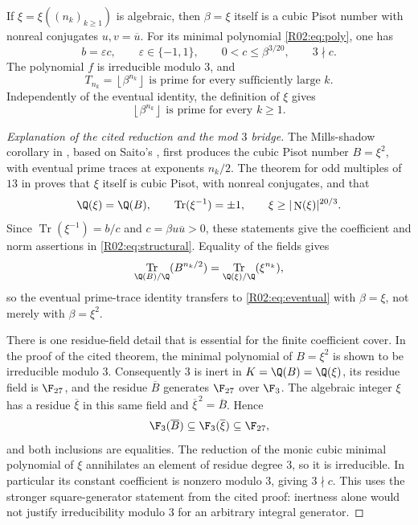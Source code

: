 \documentclass[11pt,a4paper]{article}
\theoremstyle{definition}\newtheorem{definition}[theorem]{Definition}
\theoremstyle{remark}\newtheorem{remark}[theorem]{Remark}
\newcommand{\floor}[1]{\left\lfloor#1\right\rfloor}
\DeclareMathOperator{\Tr}{Tr}\DeclareMathOperator{\tr}{tr}\DeclareMathOperator{\Nm}{N}
\begin{document}
\begin{proposition}
\label{R02:prop:input}
If $\xi=\xi((n_k)_{k\ge1})$ is algebraic, then $\beta=\xi$ itself
is a cubic Pisot number with nonreal conjugates $u,v=\overline u$.
For its minimal polynomial \eqref{R02:eq:poly}, one has
\begin{equation}\label{R02:eq:structural}
 b=\varepsilon c,\qquad \varepsilon\in\{-1,1\},\qquad
 0<c\le\beta^{3/20},\qquad 3\nmid c.
\end{equation}
The polynomial $f$ is irreducible modulo $3$, and
\begin{equation}\label{R02:eq:eventual}
 T_{n_k}=\floor{\beta^{n_k}}\text{ is prime for every sufficiently large }k.
\end{equation}
Independently of the eventual identity, the definition of $\xi$ gives
\begin{equation}\label{R02:eq:allfloors}
 \floor{\beta^{n_k}}\text{ is prime for every }k\ge1.
\end{equation}
\end{proposition}

\begin{proof}[Explanation of the cited reduction and the mod $3$ bridge]
The Mills-shadow corollary in \cite[Section~2]{K064}, based on Saito's
\cite[Proposition~3.1]{Saito}, first produces the cubic Pisot number
$B=\xi^2$, with eventual prime traces at exponents $n_k/2$.
The theorem for odd multiples of $13$ in
\cite[Section~7.2]{K064} proves that $\xi$ itself is cubic Pisot,
with nonreal conjugates, and that
\[
 \Q(\xi)=\Q(B),\qquad \Tr(\xi^{-1})=\pm1,
 \qquad \xi\ge|\Nm(\xi)|^{20/3}.
\]
Since $\Tr(\xi^{-1})=b/c$ and
$c=\beta u\overline u>0$, these statements give the coefficient and
norm assertions in \eqref{R02:eq:structural}. Equality of the fields gives
\[
 \Tr_{\Q(B)/\Q}(B^{n_k/2})
 =\Tr_{\Q(\xi)/\Q}(\xi^{n_k}),
\]
so the eventual prime-trace identity transfers to \eqref{R02:eq:eventual}
with $\beta=\xi$, not merely with $\beta=\xi^2$.

There is one residue-field detail that is essential for the finite
coefficient cover. In the proof of the cited theorem, the minimal
polynomial of $B=\xi^2$ is shown to be irreducible modulo $3$.
Consequently $3$ is inert in $K=\Q(B)=\Q(\xi)$, its residue field is
$\F_{27}$, and the residue $\overline B$ generates $\F_{27}$ over
$\F_3$. The algebraic integer $\xi$ has a residue $\overline\xi$ in
this same field and $\overline\xi^{\,2}=\overline B$. Hence
\[
 \F_3(\overline B)\subseteq\F_3(\overline\xi)\subseteq\F_{27},
\]
and both inclusions are equalities. The reduction of the monic cubic
minimal polynomial of $\xi$ annihilates an element of residue degree
$3$, so it is irreducible. In particular its constant coefficient is
nonzero modulo $3$, giving $3\nmid c$.
This uses the stronger square-generator statement from the cited proof:
inertness alone would not justify irreducibility modulo $3$ for an
arbitrary integral generator.
\end{proof}
\end{document}
